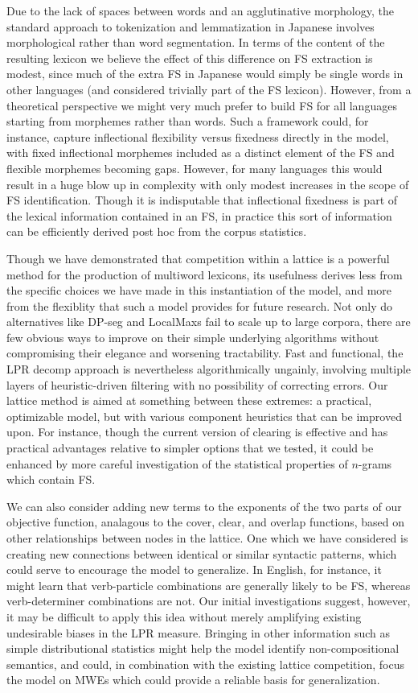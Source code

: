 \documentclass[11pt,letterpaper]{article}
\begin{document}
Due to the lack of spaces between words and an agglutinative morphology, the standard approach to tokenization and lemmatization in Japanese involves morphological rather than word segmentation. In terms of the content of the resulting lexicon we believe the effect of this difference on FS extraction is modest, since much of the extra FS in Japanese would simply be single words in other languages (and considered trivially part of the FS lexicon). However, from a theoretical perspective we might very much prefer to build FS for all languages starting from morphemes rather than words. Such a framework could, for instance, capture inflectional flexibility versus fixedness directly in the model, with fixed inflectional morphemes included as a distinct element of the FS and flexible morphemes becoming gaps. However, for many languages this would result in a huge blow up in complexity with only modest increases in the scope of FS identification. Though it is indisputable that inflectional fixedness is part of the lexical information contained in an FS, in practice this sort of information can be efficiently derived post hoc from the corpus statistics.

Though we have demonstrated that competition within a lattice is a powerful method for the production of multiword lexicons, its usefulness derives less from the specific choices we have made in this instantiation of the model, and more from the flexiblity that such a model provides for future research. Not only do alternatives like DP-seg and LocalMaxs fail to scale up to large corpora, there are few obvious ways to improve on their simple underlying algorithms without compromising their elegance and worsening tractability. Fast and functional, the LPR decomp approach is nevertheless algorithmically ungainly, involving multiple layers of heuristic-driven filtering with no possibility of correcting errors. Our lattice method is aimed at something between these extremes: a practical, optimizable model, but with various component heuristics that can be improved upon. For instance, though the current version of clearing is effective and has practical advantages relative to simpler options that we tested, it could be enhanced by more careful investigation of the statistical properties of $n$-grams which contain FS.

We can also consider adding new terms to the exponents of the two parts of our objective function, analagous to the cover, clear, and overlap functions, based on other relationships between nodes in the lattice. One which we have considered is creating new connections between identical or similar syntactic patterns, which could serve to encourage the model to generalize. In English, for instance, it might learn that verb-particle combinations are generally likely to be FS, whereas verb-determiner combinations are not. Our initial investigations suggest, however, it may be difficult to apply this idea without merely amplifying existing undesirable biases in the LPR measure. Bringing in other information such as simple distributional statistics might help the model identify non-compositional semantics, and could, in combination with the existing lattice competition, focus the model on MWEs which could provide a reliable basis for generalization.
\end{document}
